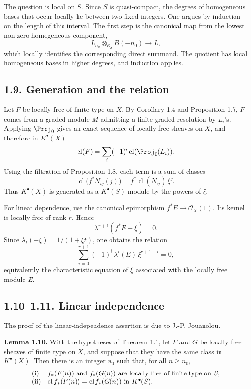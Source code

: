\documentclass[11pt]{article}
\newcommand{\cl}{\operatorname{cl}}
\begin{document}
The question is local on \(S\). Since \(S\) is quasi-compact, the degrees of homogeneous bases that occur locally lie between two fixed integers. One argues by induction on the length of this interval. The first step is the canonical map from the lowest non-zero homogeneous component,
\[
  L_{n_0}\otimes_{\mathcal O_S}B(-n_0)\longrightarrow L,
\]
which locally identifies the corresponding direct summand. The quotient has local homogeneous bases in higher degrees, and induction applies.

\subsection*{1.9. Generation and the relation}
Let \(F\) be locally free of finite type on \(X\). By Corollary 1.4 and Proposition 1.7, \(F\) comes from a graded module \(M\) admitting a finite graded resolution by \(L_i\)'s. Applying \(\Proj_0\) gives an exact sequence of locally free sheaves on \(X\), and therefore in \(K^\bullet(X)\)
\[
  \cl(F)=\sum_i(-1)^i\cl(\Proj_0(L_i)).
\]
Using the filtration of Proposition 1.8, each term is a sum of classes
\[
  \cl\bigl(f^*N_{ij}(j)\bigr)=f^*\cl(N_{ij})\,\xi^j .
\]
Thus \(K^\bullet(X)\) is generated as a \(K^\bullet(S)\)-module by the powers of \(\xi\).

For linear dependence, use the canonical epimorphism \(f^*E\to\mathcal O_X(1)\). Its kernel is locally free of rank \(r\). Hence
\[
  \lambda^{r+1}(f^*E-\xi)=0.
\]
Since \(\lambda_t(-\xi)=1/(1+\xi t)\), one obtains the relation
\begin{equation}\tag{1.9.1}
  \sum_{i=0}^{r+1}(-1)^i\,\lambda^i(E)\,\xi^{r+1-i}=0,
\end{equation}
equivalently the characteristic equation of \(\xi\) associated with the locally free module \(E\).

\subsection*{1.10--1.11. Linear independence}
The proof of the linear-independence assertion is due to J.-P. Jouanolou.

\textbf{Lemma 1.10.} With the hypotheses of Theorem 1.1, let \(F\) and \(G\) be locally free sheaves of finite type on \(X\), and suppose that they have the same class in \(K^\bullet(X)\). Then there is an integer \(n_0\) such that, for all \(n\geq n_0\),
\[
\begin{array}{ll}
\text{\rm (i)}& f_*(F(n))\text{ and }f_*(G(n))\text{ are locally free of finite type on }S,\\
\text{\rm (ii)}& \cl f_*(F(n))=\cl f_*(G(n))\text{ in }K^\bullet(S).
\end{array}
\]
\end{document}
